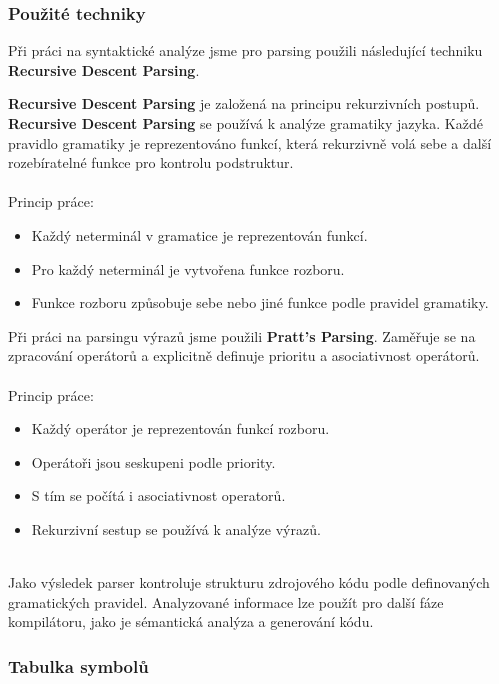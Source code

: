 \documentclass[a4paper, 11pt]{article}
\begin{document}
\subsubsection{Použité techniky}

    Při práci na syntaktické analýze jsme pro parsing použili následující techniku \textbf{Recursive Descent Parsing}.
    
    \textbf{Recursive Descent Parsing} je založená na principu rekurzivních postupů. \textbf{Recursive Descent Parsing} se používá k analýze gramatiky jazyka. Každé pravidlo gramatiky je reprezentováno funkcí, která rekurzivně volá sebe a další rozebíratelné funkce pro kontrolu podstruktur.
    \\
    \\
    Princip práce:
    \begin{itemize}
        \item Každý neterminál v gramatice je reprezentován funkcí.
        \item Pro každý neterminál je vytvořena funkce rozboru.
        \item Funkce rozboru způsobuje sebe nebo jiné funkce podle pravidel gramatiky.
    \end{itemize}

    Při práci na parsingu výrazů jsme použili \textbf{Pratt's Parsing}.
    Zaměřuje se na zpracování operátorů a explicitně definuje prioritu a asociativnost operátorů.
    \\
    \\
    Princip práce:
    \begin{itemize}
        \item Každý operátor je reprezentován funkcí rozboru.
        \item Operátoři jsou seskupeni podle priority.
        \item S tím se počítá i asociativnost operatorů.
        \item Rekurzivní sestup se používá k analýze výrazů.
    \end{itemize}

    \\
    Jako výsledek parser kontroluje strukturu zdrojového kódu podle definovaných gramatických pravidel.
    Analyzované informace lze použít pro další fáze kompilátoru, jako je sémantická analýza a generování kódu.

	
	\subsubsection{Tabulka symbolů}
\end{document}
